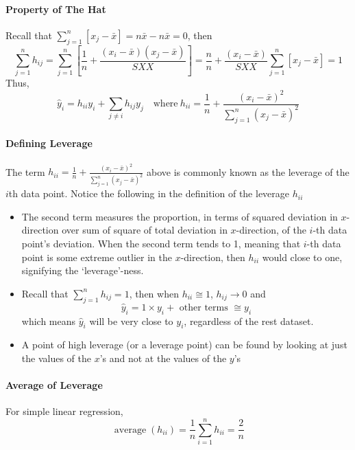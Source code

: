 \documentclass[10pt]{article}
\begin{document}
\paragraph{Property of The Hat}
Recall that $\sum_{j=1}^{n}\left[x_{j}-\bar{x}\right]=n\bar{x} - n\bar{x}=0$, then
\begin{equation*}
    \sum_{j=1}^{n} h_{i j}=\sum_{j=1}^{n}\left[\frac{1}{n}+\frac{\left(x_{i}-\bar{x}\right)\left(x_{j}-\bar{x}\right)}{S X X}\right]=\frac{n}{n}+\frac{\left(x_{i}-\bar{x}\right)}{S X X} \sum_{j=1}^{n}\left[x_{j}-\bar{x}\right]=1
\end{equation*}
Thus,
\begin{equation*}
    \hat{y}_{i}=h_{i i} y_{i}+\sum_{j \neq i} h_{i j} y_{j} \quad \text{where}~h_{i i}=\frac{1}{n}+\frac{\left(x_{i}-\bar{x}\right)^{2}}{\sum_{j=1}^{n}\left(x_{j}-\bar{x}\right)^{2}}
\end{equation*}
\paragraph{Defining Leverage} 
The term $h_{i i}=\frac{1}{n}+\frac{\left(x_{i}-\bar{x}\right)^{2}}{\sum_{j=1}^{n}\left(x_{j}-\bar{x}\right)^{2}}$ above is commonly known as the leverage of the $i$th data point. Notice the following in the definition of the leverage $h_{ii}$
\begin{itemize}
    \item The second term measures the proportion, in terms of squared deviation in $x$-direction over sum of square of total deviation in $x$-direction, of the $i$-th data point's deviation. When the second term tends to 1, meaning that $i$-th data point is some extreme outlier in the $x$-direction, then $h_{ii}$ would close to one, signifying the `leverage'-ness. 
    \item Recall that $\sum_{j=1}^{n} h_{i j}=1$, then when $h_{i i} \cong 1$, $h_{ij}\rightarrow 0$ and
        \begin{equation*}
            \hat{y}_{i}=1 \times y_{i}+\text { other terms } \cong y_{i}
        \end{equation*}
    which means $\hat{y}_{i}$  will be very close to $y_i$, regardless of the rest dataset. 
    \item A point of high leverage (or a leverage point) can be found by looking at just the values of the $x$’s and not at the values of the $y$’s
\end{itemize}

\paragraph{Average of Leverage} For simple linear regression, 
\begin{equation*}
    \operatorname{average}\left(h_{i i}\right) = \frac{1}{n}\sum_{i = 1}^n h_{ii} =\frac{2}{n}
\end{equation*}
\end{document}
